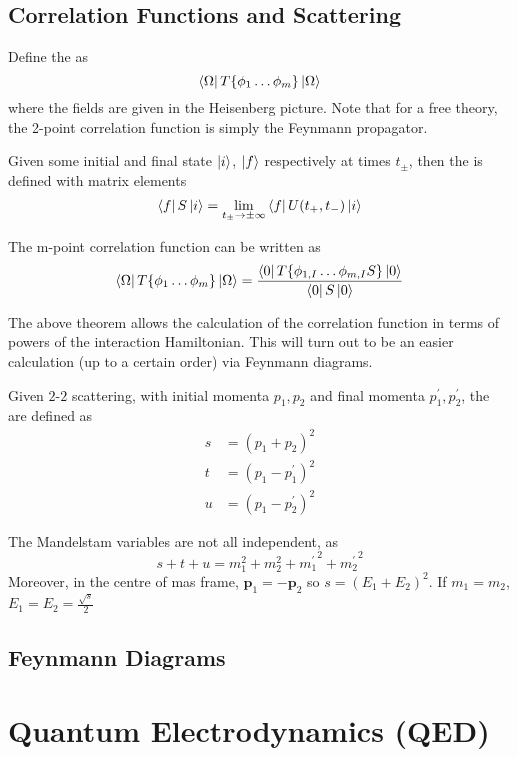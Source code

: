 \documentclass{article}
\begin{document}
\subsection{Correlation Functions and Scattering}

\begin{definition}
Define the  as 
\[
\bra{\Omega} T\{ \phi_1 \dots \phi_m \} \ket{\Omega}
\]
where the fields are given in the Heisenberg picture. Note that for a free theory, the 2-point correlation function is simply the Feynmann propagator. 
\end{definition}

\begin{definition}[$S$-matrix]
Given some initial and final state $\ket{i}$, $\ket{f}$ respectively at times $t_\pm$, then the  is defined with matrix elements 
\[
\bra{f}S\ket{i} = \lim_{t_\pm \to \pm\infty} \bra{f} U(t_+, t_-) \ket{i}
\]
\end{definition}

\begin{theorem}
The m-point correlation function can be written as 
\[
\bra{\Omega} T\{ \phi_1 \dots \phi_m \} \ket{\Omega} = \frac{\bra{0} T\{\phi_{1,I} \dots \phi_{m,I} S \} \ket{0}}{\bra{0} S \ket{0}}
\]
\end{theorem}

\begin{idea}
The above theorem allows the calculation of the correlation function in terms of powers of the interaction Hamiltonian. This will turn out to be an easier calculation (up to a certain order) via Feynmann diagrams. 
\end{idea}

\begin{definition}
Given $2$-$2$ scattering, with initial momenta $p_1,p_2$ and final momenta $p_1^\prime, p_2^\prime$, the  are defined as 
\begin{align*}
    s &= (p_1 + p_2)^2 \\ 
    t &= (p_1 - p_1^\prime)^2 \\
    u &= (p_1 - p_2^\prime)^2 
\end{align*}
\end{definition}

\begin{theorem}
The Mandelstam variables are not all independent, as 
\[
s+t+u = m_1^2 + m_2^2 + {m_1^\prime}^2 +{m_2^\prime}^2
\]
Moreover, in the centre of mas frame, $\bm{p}_1 = -\bm{p}_2$ so $s=(E_1+E_2)^2$. If $m_1 = m_2$, $E_1=E_2 = \frac{\sqrt{s}}{2}$
\end{theorem}

\subsection{Feynmann Diagrams}

\section{Quantum Electrodynamics (QED)}
\end{document}
